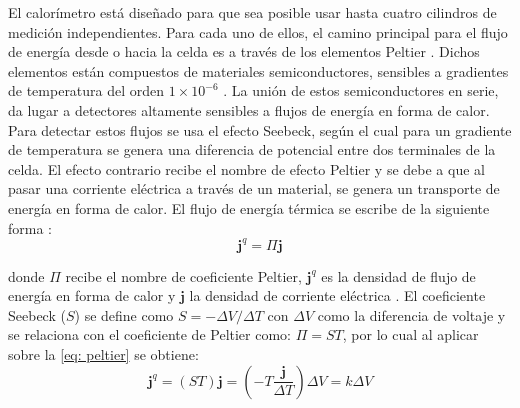 	El calor\'imetro est\'a dise\~nado para que sea posible usar hasta cuatro cilindros de medici\'on independientes. Para cada uno de ellos, el camino principal para el flujo de energ\'ia desde o hacia la celda es a trav\'es de los elementos Peltier \cite{Suurkuusk}. Dichos elementos est\'an compuestos de materiales semiconductores, sensibles a gradientes de temperatura del orden $1\times10^{-6}$ \grad{} \cite{Suurkuusk, simon2013oxford}. La uni\'on de estos semiconductores en serie, da lugar a detectores altamente sensibles a flujos de energ\'ia en forma de calor. Para detectar estos flujos se usa el efecto Seebeck, seg\'un el cual para un gradiente de temperatura se genera una diferencia de potencial entre dos terminales de la celda. El efecto contrario recibe el nombre de efecto Peltier y se debe a que al pasar una corriente el\'ectrica a trav\'es de un material, se genera un transporte de energ\'ia en forma de calor. El flujo de energ\'ia t\'ermica se escribe de la siguiente forma \cite{simon2013oxford}:
	\begin{equation}\label{eq: peltier}
		\mathbf{j}^q = \Pi \mathbf{j}
	\end{equation}
	
	donde $\Pi$ recibe el nombre de coeficiente Peltier, $\mathbf{j}^q$ es la densidad de flujo de energ\'ia en forma de calor y $\mathbf{j}$ la densidad de corriente el\'ectrica \cite{simon2013oxford}. El coeficiente Seebeck ($S$) se define como $S = -\Delta V/\Delta T$ con $\Delta V$ como la diferencia de voltaje y se relaciona con el coeficiente de Peltier como: $\Pi = ST$, por lo cual al aplicar sobre la \autoref{eq: peltier} se obtiene:
	\begin{equation}\label{eq: seebeck}
		\mathbf{j}^q = (ST) \mathbf{j} = \left(-T\dfrac{\mathbf{j}}{\Delta T}\right)\Delta V = k\Delta V
	\end{equation}
	
